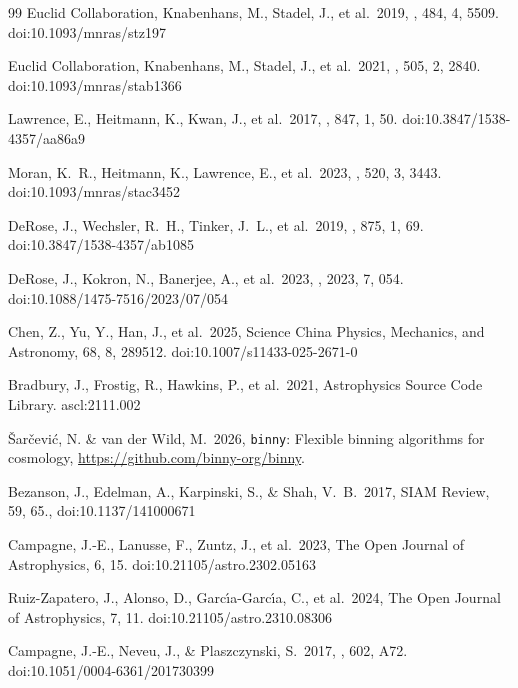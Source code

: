 \documentclass[a4paper, 11pt]{article}
\begin{document}
\begin{thebibliography}{99}
 Euclid Collaboration, Knabenhans, M., Stadel, J., et al.\ 2019, \mnras, 484, 4, 5509. doi:10.1093/mnras/stz197

 Euclid Collaboration, Knabenhans, M., Stadel, J., et al.\ 2021, \mnras, 505, 2, 2840. doi:10.1093/mnras/stab1366

 Lawrence, E., Heitmann, K., Kwan, J., et al.\ 2017, \apj, 847, 1, 50. doi:10.3847/1538-4357/aa86a9

 Moran, K.~R., Heitmann, K., Lawrence, E., et al.\ 2023, \mnras, 520, 3, 3443. doi:10.1093/mnras/stac3452

 DeRose, J., Wechsler, R.~H., Tinker, J.~L., et al.\ 2019, \apj, 875, 1, 69. doi:10.3847/1538-4357/ab1085

 DeRose, J., Kokron, N., Banerjee, A., et al.\ 2023, \jcap, 2023, 7, 054. doi:10.1088/1475-7516/2023/07/054

 Chen, Z., Yu, Y., Han, J., et al.\ 2025, Science China Physics, Mechanics, and Astronomy, 68, 8, 289512. doi:10.1007/s11433-025-2671-0

 Bradbury, J., Frostig, R., Hawkins, P., et al.\ 2021, Astrophysics Source Code Library. ascl:2111.002

 {\v S}ar{\v c}evi{\'c}, N. \& van der Wild, M.\ 2026, \texttt{binny}: Flexible binning algorithms for cosmology, \url{https://github.com/binny-org/binny}.

 Bezanson, J., Edelman, A., Karpinski, S., \& Shah, V.~B.\ 2017, SIAM Review, 59, 65., doi:10.1137/141000671

 Campagne, J.-E., Lanusse, F., Zuntz, J., et al.\ 2023, The Open Journal of Astrophysics, 6, 15. doi:10.21105/astro.2302.05163

 Ruiz-Zapatero, J., Alonso, D., Garc{\'\i}a-Garc{\'\i}a, C., et al.\ 2024, The Open Journal of Astrophysics, 7, 11. doi:10.21105/astro.2310.08306

 Campagne, J.-E., Neveu, J., \& Plaszczynski, S.\ 2017, \aap, 602, A72. doi:10.1051/0004-6361/201730399


\end{thebibliography}
\end{document}
